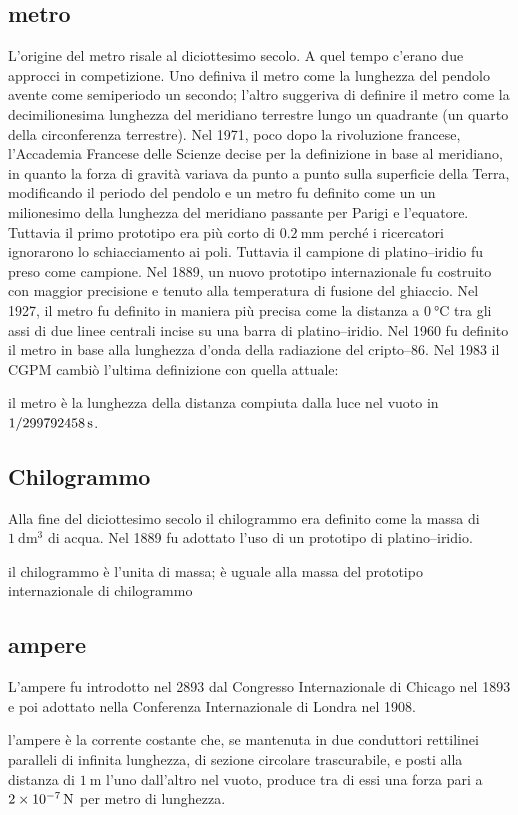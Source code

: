 \subsection{metro}
L'origine del metro risale al diciottesimo secolo. A quel tempo c'erano due approcci in competizione. Uno definiva il metro come la lunghezza del pendolo avente come semiperiodo un secondo; l'altro suggeriva di definire il metro come la decimilionesima lunghezza del meridiano terrestre lungo un quadrante (un quarto della circonferenza terrestre). Nel 1971, poco dopo la rivoluzione francese, l'Accademia Francese delle Scienze decise per la definizione in base al meridiano, in quanto la forza di gravità variava da punto a punto sulla superficie della Terra, modificando il periodo del pendolo e un metro fu definito come un un milionesimo della lunghezza del meridiano passante per Parigi e l'equatore. Tuttavia il primo prototipo era più corto di $\SI{0.2}{\milli\meter}$ perché i ricercatori ignorarono lo schiacciamento ai poli. Tuttavia il campione di platino--iridio fu preso come campione. Nel 1889, un nuovo prototipo internazionale fu costruito con maggior precisione e tenuto alla temperatura di fusione del ghiaccio. Nel 1927, il metro fu definito in maniera più precisa come la distanza a $\SI{0}{\celsius}$ tra gli assi di due linee centrali incise su una barra di platino--iridio. Nel 1960 fu definito il metro in base alla lunghezza d'onda della radiazione del cripto--86. Nel 1983 il CGPM cambiò l'ultima definizione con quella attuale:
\begin{definizioneunita}
  il metro è la lunghezza della distanza compiuta dalla luce nel vuoto in $\SI[parse-numbers = false]{1/299792458}{\second}$.
\end{definizioneunita}
\subsection{Chilogrammo}
Alla fine del diciottesimo secolo il chilogrammo era definito come la massa di $\SI{1}{\deci\meter\cubed}$ di acqua. Nel 1889 fu adottato l'uso di un prototipo di platino--iridio.
\begin{definizioneunita}
  il chilogrammo è l'unita di massa; è uguale alla massa del prototipo internazionale di chilogrammo
\end{definizioneunita}
\subsection{ampere}
L'ampere fu introdotto nel 2893 dal Congresso Internazionale di Chicago nel 1893 e poi adottato nella Conferenza Internazionale di Londra nel 1908.
\begin{definizioneunita}
  l'ampere è la corrente costante che, se mantenuta in due conduttori rettilinei paralleli di infinita lunghezza, di sezione circolare trascurabile, e posti alla distanza di $\SI{1}{\meter}$ l'uno dall'altro nel vuoto, produce tra di essi una forza pari a $\SI{2E-7}{\newton}$ per metro di lunghezza.
\end{definizioneunita}

